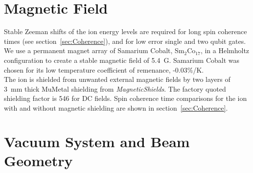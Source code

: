 
\section{Magnetic Field}
\label{sec:Magnetic Field}
    Stable Zeeman shifts of the ion energy levels are required for long spin coherence times (see section~\ref{sec:Coherence}), and for low error single and two qubit gates. We use a permanent magnet array of Samarium Cobalt, Sm$_2$Co$_17$, in a Helmholtz configuration to create a stable magnetic field of 5.4~G. Samarium Cobalt was chosen for its low temperature coefficient of remenance, -0.03\%/K.\\
    The ion is shielded from unwanted external magnetic fields by two layers of 3~mm thick MuMetal shielding from \emph{MagneticShields}. The factory quoted shielding factor is 546 for DC fields. Spin coherence time comparisons for the ion with and without magnetic shielding are shown in section~\ref{sec:Coherence}.\\

\section{Vacuum System and Beam Geometry}
\label{sec:Vacuum System}


